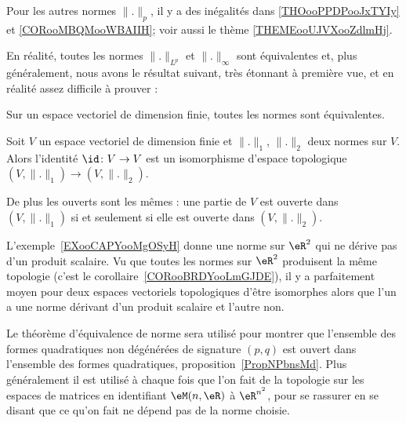 Pour les autres normes \( \| . \|_p\), il y a des inégalités dans \ref{THOooPPDPooJxTYIy} et \ref{CORooMBQMooWBAIIH}; voir aussi le thème \ref{THEMEooUJVXooZdlmHj}.

En réalité, toutes les normes \( \| . \|_{L^p}\) et \( \| . \|_{\infty}\) sont équivalentes et, plus généralement, nous avons le résultat suivant, très étonnant à première vue, et en réalité assez difficile à prouver :
\begin{theorem}		\label{ThoNormesEquiv}
	Sur un espace vectoriel de dimension finie, toutes les normes sont équivalentes.
\end{theorem}

\begin{corollary}       \label{CORooBRDYooLmGJDE}
    Soit \( V\) un espace vectoriel de dimension finie et \( \| . \|_1\), \( \| . \|_2\) deux normes sur \( V\). Alors l'identité \( \id\colon V\to V\) est un isomorphisme d'espace topologique \( (V,\| . \|_1)\to (V,\| . \|_2)\).

    De plus les ouverts sont les mêmes : une partie de \( V\) est ouverte dans \( (V,\| . \|_1)\) si et seulement si elle est ouverte dans \( (V,\| . \|_2)\).
\end{corollary}

\begin{normaltext}
    L'exemple~\ref{EXooCAPYooMgOSyH} donne une norme sur \( \eR^2\) qui ne dérive pas d'un produit scalaire. Vu que toutes les normes sur \( \eR^2\) produisent la même topologie (c'est le corollaire~\ref{CORooBRDYooLmGJDE}), il y a parfaitement moyen pour deux espaces vectoriels topologiques d'être isomorphes alors que l'un a une norme dérivant d'un produit scalaire et l'autre non.
\end{normaltext}

Le théorème d'équivalence de norme sera utilisé pour montrer que l'ensemble des formes quadratiques non dégénérées de signature \( (p,q)\) est ouvert dans l'ensemble des formes quadratiques, proposition~\ref{PropNPbnsMd}. Plus généralement il est utilisé à chaque fois que l'on fait de la topologie sur les espaces de matrices en identifiant \( \eM(n,\eR)\) à \( \eR^{n^2}\), pour se rassurer en se disant que ce qu'on fait ne dépend pas de la norme choisie.

